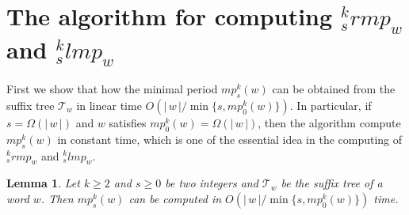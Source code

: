 \documentclass{article}
\def\abs#1{{|\,#1\,|}}
\def\tree{\mathcal{T}}
\newtheorem{lemma}[theorem]{Lemma}
\begin{document}
\section{The algorithm for computing ${}_s^krmp_w$ and ${}_s^klmp_w$}
First we show that how the minimal period $mp_s^k(w)$ can be
obtained from the suffix tree $\tree_w$ in linear time
$O(\abs{w}/\min\{s,mp_0^k(w)\})$. In particular, if
$s=\Omega(\abs{w})$ and $w$ satisfies $mp_0^k(w)=\Omega(\abs{w})$,
then the algorithm compute $mp_s^k(w)$ in constant time, which is
one of the essential idea in the computing of ${}_s^krmp_w$ and
${}_s^klmp_w$.


\begin{lemma}\label{lemma:mpcret}
Let $k\geq2$ and $s\geq0$ be two integers and $\tree_w$ be the
suffix tree of a word $w$. Then $mp_s^k(w)$ can be computed in
$O\left({\abs{w}}/\min\{s,mp_0^k(w)\}\right)$ time.
\end{lemma}
\end{document}
